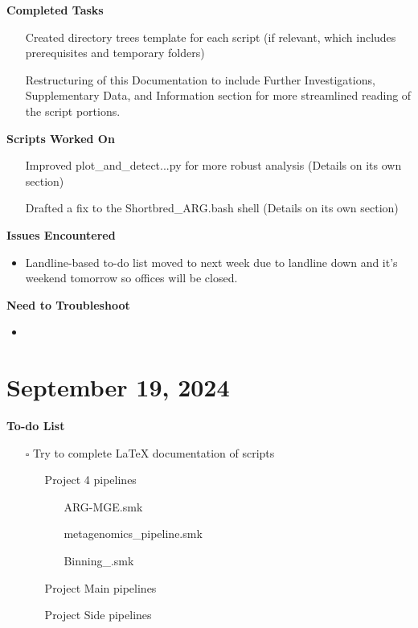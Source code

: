 \documentclass[11pt]{report}
\newcommand{\done}{\checkmark}
\newcommand{\pending}{$\square$}
\newcommand{\moved}{\faArrowCircleRight}
\begin{document}
{\textbf{Completed Tasks} 
\begin{itemize}
	\item [\done] Created directory trees template for each script (if relevant, which includes prerequisites and temporary folders)
	\item [\done] Restructuring of this Documentation to include Further Investigations, Supplementary Data, and Information section for more streamlined reading of the script portions. 
\end{itemize}

\textbf{Scripts Worked On}
\begin{itemize}
	\item [\done] Improved plot\_and\_detect...py for more robust analysis (Details on its own section)
	\item [\done] Drafted a fix to the Shortbred\_ARG.bash shell (Details on its own section)
\end{itemize}


\textbf{Issues Encountered}
\begin{itemize}
	\item Landline-based to-do list moved to next week due to landline down and it's weekend tomorrow so offices will be closed. 
\end{itemize}

\textbf{Need to Troubleshoot}
\begin{itemize}
	\item 
\end{itemize}

\newpage
\section{September 19, 2024}


\textbf{To-do List}
\begin{itemize}
	\item [\pending] Try to complete LaTeX documentation of scripts
	
	\begin{itemize}
		\item [\done] Project 4 pipelines
			\begin{itemize}
				\item [\done] ARG-MGE.smk
				\item [\done] metagenomics\_pipeline.smk
				\item [\done] Binning\_.smk
			\end{itemize}
		\item [\moved] Project Main pipelines
		\item [\moved] Project Side pipelines
		

\end{itemize}
\end{itemize}}
\end{document}
